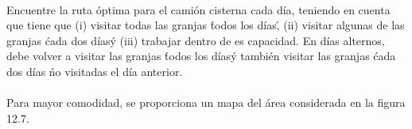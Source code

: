 \paragraph{} Encuentre la ruta óptima para el camión cisterna cada día, teniendo en cuenta que tiene que (i) visitar todas las granjas \' todos los días\', (ii) visitar algunas de las granjas \' cada dos días\' y (iii) trabajar dentro de es capacidad. En días alternos, debe volver a visitar las granjas \' todos los días\' y también visitar las granjas \' cada dos días \' no visitadas el día anterior.
\paragraph{} Para mayor comodidad, se proporciona un mapa del área considerada en la figura 12.7.